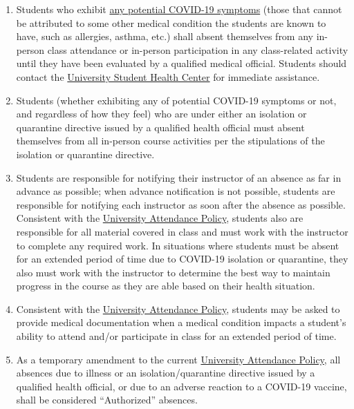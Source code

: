 \documentclass[
]{book}
\providecommand{\tightlist}{%
  \setlength{\itemsep}{0pt}\setlength{\parskip}{0pt}}
\begin{document}
\begin{enumerate}
\def\labelenumi{\arabic{enumi}.}
\tightlist
\item
  Students who exhibit \href{https://www.cdc.gov/coronavirus/2019-ncov/symptoms-testing/symptoms.html}{any potential COVID-19 symptoms} (those that cannot be attributed to some other medical condition the students are known to have, such as allergies, asthma, etc.) shall absent themselves from any in-person class attendance or in-person participation in any class-related activity until they have been evaluated by a qualified medical official. Students should contact the \href{https://www.slu.edu/life-at-slu/student-health/index.php}{University Student Health Center} for immediate assistance.
\item
  Students (whether exhibiting any of potential COVID-19 symptoms or not, and regardless of how they feel) who are under either an isolation or quarantine directive issued by a qualified health official must absent themselves from all in-person course activities per the stipulations of the isolation or quarantine directive.
\item
  Students are responsible for notifying their instructor of an absence as far in advance as possible; when advance notification is not possible, students are responsible for notifying each instructor as soon after the absence as possible. Consistent with the \href{https://catalog.slu.edu/academic-policies/academic-policies-procedures/attendance/}{University Attendance Policy}, students also are responsible for all material covered in class and must work with the instructor to complete any required work. In situations where students must be absent for an extended period of time due to COVID-19 isolation or quarantine, they also must work with the instructor to determine the best way to maintain progress in the course as they are able based on their health situation.
\item
  Consistent with the \href{https://catalog.slu.edu/academic-policies/academic-policies-procedures/attendance/}{University Attendance Policy}, students may be asked to provide medical documentation when a medical condition impacts a student's ability to attend and/or participate in class for an extended period of time.
\item
  As a temporary amendment to the current \href{https://catalog.slu.edu/academic-policies/academic-policies-procedures/attendance/}{University Attendance Policy}, all absences due to illness or an isolation/quarantine directive issued by a qualified health official, or due to an adverse reaction to a COVID-19 vaccine, shall be considered ``Authorized'' absences.
\end{enumerate}
\end{document}

